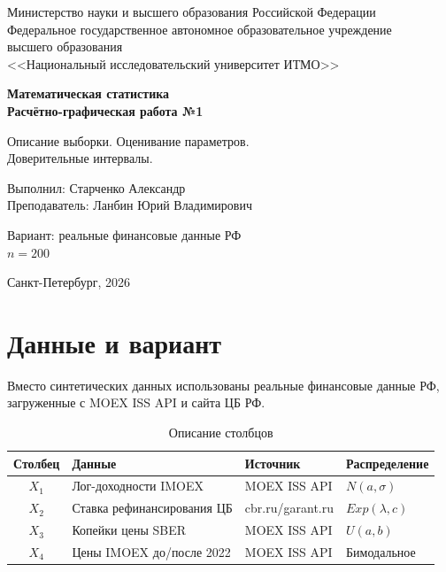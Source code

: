 \documentclass[12pt, a4paper]{article}
\begin{document}
\begin{titlepage}
\centering
\vspace*{1cm}
{\small Министерство науки и высшего образования Российской Федерации\\
Федеральное государственное автономное образовательное учреждение\\
высшего образования\\
<<Национальный исследовательский университет ИТМО>>}

\vspace{2cm}
{\Large\bfseries Математическая статистика\\[0.3cm]
Расчётно-графическая работа №1}

\vspace{1cm}
{\large Описание выборки. Оценивание параметров.\\
Доверительные интервалы.}

\vspace{2cm}
\begin{flushleft}
\hspace{7cm}Выполнил: Старченко Александр\\
\hspace{7cm}Преподаватель: Ланбин Юрий Владимирович\\
\end{flushleft}

\vspace{1cm}
{\large Вариант: реальные финансовые данные РФ\\
$n = 200$}

\vfill
Санкт-Петербург, 2026
\end{titlepage}

\tableofcontents
\newpage

\section{Данные и вариант}

Вместо синтетических данных использованы реальные финансовые данные РФ, загруженные с MOEX ISS API и сайта ЦБ РФ.

\begin{table}[H]
\centering
\caption{Описание столбцов}
\begin{tabular}{clll}
\toprule
Столбец & Данные & Источник & Распределение \\
\midrule
$X_1$ & Лог-доходности IMOEX & MOEX ISS API & $N(a, \sigma)$ \\
$X_2$ & Ставка рефинансирования ЦБ & cbr.ru/garant.ru & $Exp(\lambda, c)$ \\
$X_3$ & Копейки цены SBER & MOEX ISS API & $U(a, b)$ \\
$X_4$ & Цены IMOEX до/после 2022 & MOEX ISS API & Бимодальное \\
\bottomrule
\end{tabular}
\end{table}
\end{document}
